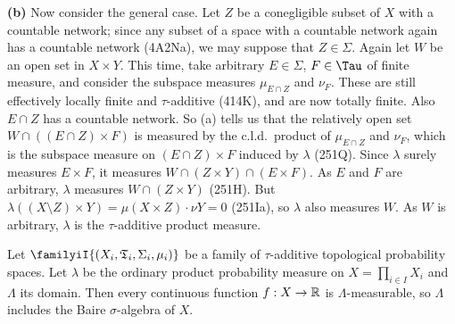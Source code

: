 {\medskip

{\bf (b)} Now consider the general case.   Let $Z$ be a conegligible
subset of $X$ with a countable network;  since any subset of a space
with a countable network again has a countable network (4A2Na), we may
suppose that $Z\in\Sigma$.   Again let $W$ be an open set in
$X\times Y$.   This time, take arbitrary $E\in\Sigma$, $F\in\Tau$ of
finite measure, and consider the subspace measures $\mu_{E\cap Z}$ and
$\nu_F$.   These are still effectively locally finite and
$\tau$-additive (414K), and are now totally finite.   Also $E\cap Z$
has a countable network.   So (a) tells us that the relatively open set
$W\cap((E\cap Z)\times F)$ is measured by the c.l.d.\ product of
$\mu_{E\cap Z}$ and $\nu_F$, which is the subspace measure on
$(E\cap Z)\times F$ induced by $\lambda$ (251Q).   Since $\lambda$
surely measures $E\times F$, it measures
$W\cap(Z\times Y)\cap(E\times F)$.   As $E$ and $F$ are arbitrary,
$\lambda$ measures $W\cap(Z\times Y)$ (251H).   But
$\lambda((X\setminus Z)\times Y)=\mu(X\times Z)\cdot\nu Y=0$ (251Ia), so
$\lambda$ also measures $W$.   As $W$ is arbitrary, $\lambda$ is the
$\tau$-additive product measure.
}%

 Let
$\familyiI{(X_i,\frak T_i,\Sigma_i,\mu_i)}$
be a family of $\tau$-additive topological probability spaces.   Let
$\lambda$ be the ordinary product probability measure on
$X=\prod_{i\in I}X_i$ and $\Lambda$ its domain.
Then every continuous function $f:X\to\Bbb R$ is
$\Lambda$-measurable, so $\Lambda$ includes the Baire $\sigma$-algebra
of $X$.

